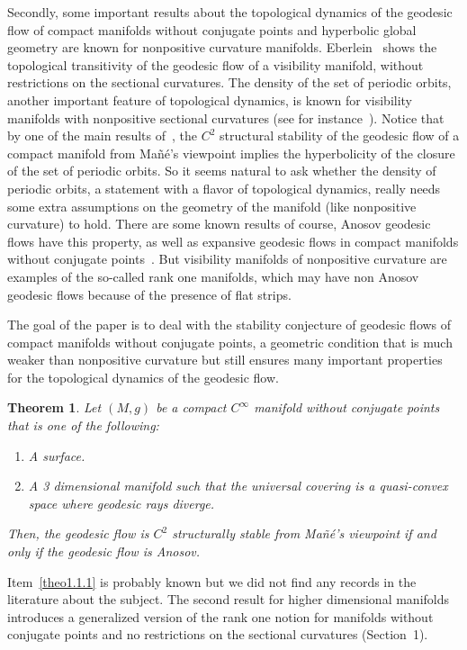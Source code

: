 \documentclass[10pt]{amsart}
\newtheorem{theo}[cdrthm]{Theorem}
\theoremstyle{definition}
\begin{document}
Secondly, some important results about the topological dynamics of the geodesic flow of compact manifolds without conjugate points and hyperbolic global geometry are known for nonpositive curvature manifolds. Eberlein~\cite{kn:Eberlein} shows the topological transitivity of the geodesic flow of a visibility manifold, without restrictions on the sectional curvatures. The density of the set of periodic orbits, another important feature of topological dynamics, is known for visibility manifolds with nonpositive sectional curvatures (see for instance~\cite{kn:Ballmann}). Notice that by one of the main results of~\cite{kn:ARR}, the $C^{2}$ structural stability of the geodesic flow of a compact manifold from Mañé's viewpoint implies the hyperbolicity of the closure of the set of periodic orbits. So it seems natural to ask whether the density of periodic orbits, a statement with a flavor of topological dynamics, really needs some extra assumptions on the geometry of the manifold (like nonpositive curvature) to hold. There are some known results of course, Anosov geodesic flows have this property, as well as expansive geodesic flows in compact manifolds without conjugate points~\cite{kn:Ruggiero-expansive}. But visibility manifolds of nonpositive curvature are examples of the so-called rank one manifolds, which may have non Anosov geodesic flows because of the presence of flat strips.

The goal of the paper is to deal with the stability conjecture of geodesic flows of compact manifolds without conjugate points, a geometric condition that is much weaker than nonpositive curvature but still ensures many important properties for the topological dynamics of the geodesic flow.
\goodbreak


\begin{theo}\label{main1}
Let $(M,g)$ be a compact $C^{\infty}$ manifold without conjugate points that is one of the following:
\begin{enumerate}
\item \label{theo1.1.1} A surface.
\item \label{theo1.1.2} A 3 dimensional manifold such that the universal covering is a quasi-convex space where geodesic rays diverge.
\end{enumerate}
Then, the geodesic flow is $C^{2}$ structurally stable from Mañé's viewpoint if and only if the geodesic flow is Anosov.
\end{theo}


Item~\eqref{theo1.1.1} is probably known but we did not find any records in the literature about the subject. The second result for higher dimensional manifolds introduces a generalized version of the rank one notion for manifolds without conjugate points and no restrictions on the sectional curvatures (Section~1).
\end{document}
